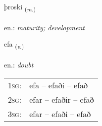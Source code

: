 \documentclass[frontgrid, backgrid]{flacards}\usepackage[]{graphicx}\usepackage[]{xcolor}
\begin{document}
\renewcommand{\flhead}{\vskip5pt \fboxsep=0pt {\small\bfseries\footnotesize Nafnorð | Noun}}
\renewcommand{\fcfoot}{\vskip5pt \fboxsep=0pt \hspace{2pt}{\small\bfseries\footnotesize 2K}}

\renewcommand{\blhead}{\vskip5pt {\small\bfseries\footnotesize Nafnorð | Noun }}
\renewcommand{\bcfoot}{\vskip5pt \hspace{2pt}{\small\bfseries\footnotesize 2K}}


{þroski \small{\textsubscript{(\textit{m.})}} \\[1ex] %
\textphonetic{[θrɔscɪ]} \\
en.: \emph{maturity; development} \\  [2ex]
\renewcommand*{\arraystretch}{0.8}
}

\renewcommand{\flhead}{\vskip5pt \fboxsep=0pt {\small\bfseries\footnotesize Sagnorð | Verb}}
\renewcommand{\fcfoot}{\vskip5pt \fboxsep=0pt \hspace{2pt}{\small\bfseries\footnotesize 2K}}

\renewcommand{\blhead}{\vskip5pt {\small\bfseries\footnotesize Sagnorð | Verb }}
\renewcommand{\bcfoot}{\vskip5pt \hspace{2pt}{\small\bfseries\footnotesize 2K}}


{efa \small{\textsubscript{(\textit{v.})}} \\[1ex] %
\textphonetic{[ɛːva]} \\
en.: \emph{doubt} \\  [2ex]
\renewcommand*{\arraystretch}{0.8}
\begin{tabular}{p{1cm}l}
\textsc{1sg}: & efa -- efaði -- efað \\ 
\textsc{2sg}: & efar -- efaðir -- efað \\ 
\textsc{3sg}: & efar -- efaði -- efað \\ 
\end{tabular}
}
\end{document}
